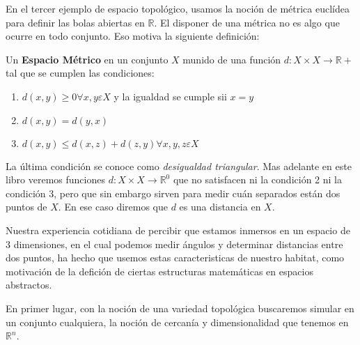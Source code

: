 
En el tercer ejemplo de espacio topol\'ogico, usamos la noci\'on de m\'etrica eucl\'idea para definir las bolas abiertas en $\mathbb{R}$. El disponer de una m\'etrica no es algo que ocurre en todo conjunto. Eso motiva la siguiente definici\'on:

\begin{definicion}
Un {\bf Espacio M\'etrico} en un conjunto $X$ munido de una funci\'on $d: X \times X \rightarrow \mathbb{R}+$ tal que se cumplen las condiciones:
\begin{enumerate}
\item $d(x,y) \geq 0 \forall x,y \varepsilon X$ y la igualdad se cumple sii $x=y$
\item $d(x,y) = d(y,x)$
\item $d(x,y) \leq d(x,z)+d(z,y) \forall x,y,z \varepsilon X$
\end{enumerate}
\end{definicion}
La \'ultima condici\'on se conoce como {\it desigualdad triangular}. Mas adelante en este libro veremos funciones $d: X \times X \rightarrow \mathbb{R}^0$ que no satisfacen ni la condici\'on 2 ni la condici\'on 3, pero que sin embargo sirven para medir cu\'an separados est\'an dos puntos de $X$. En ese caso diremos que $d$ es una distancia en $X$.

Nuestra experiencia cotidiana de percibir que estamos inmersos en un espacio de 3 dimensiones, en el cual podemos medir \'angulos y determinar distancias entre dos puntos, ha hecho que usemos estas caracteristicas de nuestro habitat, como motivaci\'on de la defici\'on de ciertas estructuras matem\'aticas en espacios abstractos.

En primer lugar, con la noci\'on de una variedad topol\'ogica buscaremos simular en un conjunto cualquiera, la noci\'on de cercan\'ia y dimensionalidad que tenemos en $\mathbb{R}^n$.

